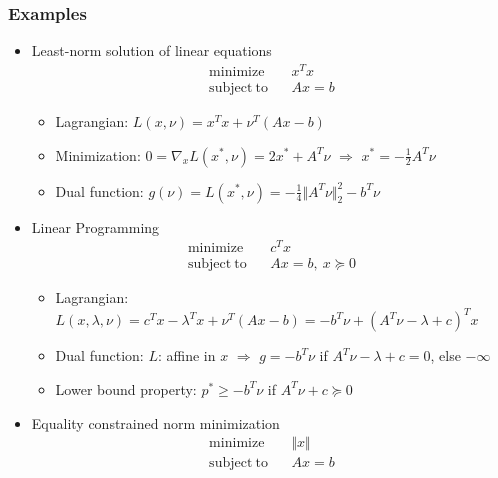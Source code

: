\subsubsection*{Examples}
\begin{itemize}
    \item Least-norm solution of linear equations
    \begin{equation}\begin{aligned}
        \mathrm{minimize}~~&~~x^Tx \\
        \mathrm{subject~to}~~&~~Ax = b
    \end{aligned}\end{equation}
    \begin{itemize}
        \item Lagrangian: $L(x,\nu) = x^Tx + \nu^T(Ax-b)$
        \item Minimization: $0 = \nabla_xL(x^\ast,\nu) = 2x^\ast+A^T\nu$ $\Rightarrow$ $x^\ast=-\frac{1}{2}A^T\nu$
        \item Dual function: $g(\nu)=L(x^\ast,\nu)=-\frac{1}{4}\Vert A^T\nu\Vert_2^2-b^T\nu$
    \end{itemize}
    \item Linear Programming
    \begin{equation}\begin{aligned}
        \mathrm{minimize}~~&~~c^Tx \\
        \mathrm{subject~to}~~&~~Ax = b,~x\succeq 0
    \end{aligned}\end{equation}
    \begin{itemize}
        \item Lagrangian: $L(x,\lambda,\nu)=c^Tx-\lambda^Tx+\nu^T(Ax-b)=-b^T\nu+(A^T\nu-\lambda+c)^Tx$
        \item Dual function: $L$: affine in $x$ $\Rightarrow$ $g = -b^T\nu$ if $A^T\nu-\lambda+c=0$, else $-\infty$
        \item Lower bound property: $p^\ast\geq-b^T\nu$ if $A^T\nu + c \succeq 0$
    \end{itemize}
    \item Equality constrained norm minimization
    \begin{equation}\begin{aligned}
        \mathrm{minimize}~~&~~\Vert x \Vert \\
        \mathrm{subject~to}~~&~~Ax = b
    \end{aligned}\end{equation}
    \begin{itemize}

\end{itemize}
\end{itemize}
